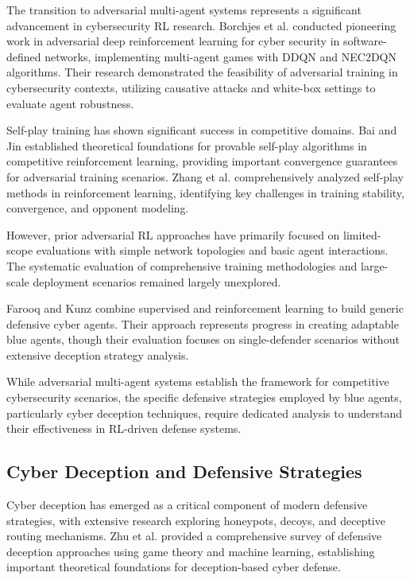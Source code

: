 \documentclass[12pt,oneside]{article}
\begin{document}
The transition to adversarial multi-agent systems represents a significant advancement in cybersecurity RL research. Borchjes et al. \cite{borchjes2023adversarial} conducted pioneering work in adversarial deep reinforcement learning for cyber security in software-defined networks, implementing multi-agent games with DDQN and NEC2DQN algorithms. Their research demonstrated the feasibility of adversarial training in cybersecurity contexts, utilizing causative attacks and white-box settings to evaluate agent robustness.

Self-play training has shown significant success in competitive domains. Bai and Jin \cite{bai2020provable} established theoretical foundations for provable self-play algorithms in competitive reinforcement learning, providing important convergence guarantees for adversarial training scenarios. Zhang et al. \cite{zhang2024survey} comprehensively analyzed self-play methods in reinforcement learning, identifying key challenges in training stability, convergence, and opponent modeling.

However, prior adversarial RL approaches have primarily focused on limited-scope evaluations with simple network topologies and basic agent interactions. The systematic evaluation of comprehensive training methodologies and large-scale deployment scenarios remained largely unexplored.

Farooq and Kunz \cite{farooq2025combining} combine supervised and reinforcement learning to build generic defensive cyber agents. Their approach represents progress in creating adaptable blue agents, though their evaluation focuses on single-defender scenarios without extensive deception strategy analysis.

While adversarial multi-agent systems establish the framework for competitive cybersecurity scenarios, the specific defensive strategies employed by blue agents, particularly cyber deception techniques, require dedicated analysis to understand their effectiveness in RL-driven defense systems.

\subsection{Cyber Deception and Defensive Strategies}

Cyber deception has emerged as a critical component of modern defensive strategies, with extensive research exploring honeypots, decoys, and deceptive routing mechanisms. Zhu et al. \cite{zhu2021survey} provided a comprehensive survey of defensive deception approaches using game theory and machine learning, establishing important theoretical foundations for deception-based cyber defense.
\end{document}
